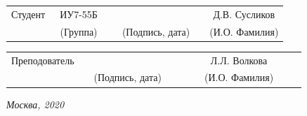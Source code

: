\documentclass[14pt, a4paper]{extarticle}
\begin{document}
	
	\noindent
	\\
	
	\noindent
	\\
	
	\vspace{1.5cm}
	\noindent
	\begin{tabular}{l c c c c c}
		Студент      & ~ИУ7-55Б~               & \hspace{2.5cm} & \hspace{2cm}                 & &  Д.В. 
		Сусликов \\\cline{2-2}\cline{4-4} \cline{6-6} 
		\hspace{3cm} & {\footnotesize(Группа)} &                & {\footnotesize(Подпись, дата)} & & {\footnotesize(И.О. Фамилия)}
	\end{tabular}
	
	\noindent
	\begin{tabular}{l c c c c}
		Преподователь & \hspace{5cm}   & \hspace{2cm}                 & & ~~~~~~Л.Л. Волкова~~~~~~\\\cline{3-3} \cline{5-5} 
		\hspace{3cm}  &                & {\footnotesize(Подпись, дата)} & & {\footnotesize(И.О. Фамилия)}
	\end{tabular}
	
	\vspace{0.6cm}
	\begin{center}	
		\vfill
		\large \textit {Москва, 2020}
	\end{center}
	
	\thispagestyle {empty}
	\pagebreak
	
	\clearpage
	\tableofcontents
	
	
	\clearpage
\end{document}
